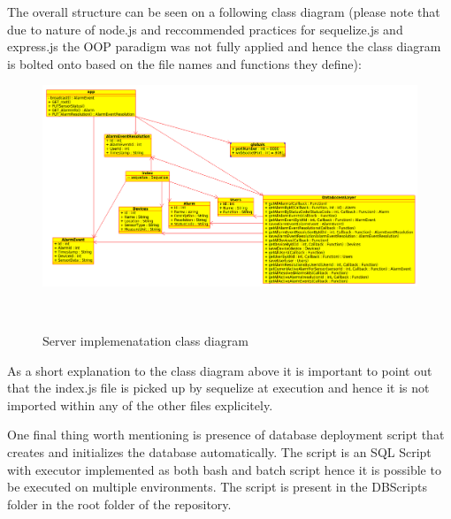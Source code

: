 The overall structure can be seen on a following class diagram (please note that due to nature of node.js and reccommended practices for sequelize.js and express.js the OOP paradigm was not fully applied and hence the class diagram is bolted onto based on the file names and functions they define):
\bigskip
\begin{figure}[H]
\centering
\includegraphics[scale=0.3]{gfx/class}
\caption{Server implemenatation class diagram}~\label{fig:serverClass}
\end{figure}
\smallskip
As a short explanation to the class diagram above it is important to point out that the index.js file is picked up by sequelize at execution and hence it is not imported within any of the other files explicitely.

\smallskip

One final thing worth mentioning is presence of database deployment script that creates and initializes the database automatically. The script is an SQL Script with executor implemented as both bash and batch script hence it is possible to be executed on multiple environments. The script is present in the DBScripts folder in the root folder of the repository.
